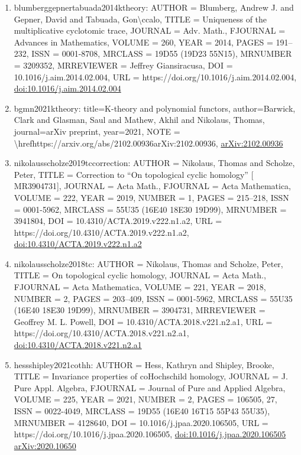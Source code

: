 \documentclass[11pt]{article}
\begin{document}
\begin{enumerate}[leftmargin=*]
  \item blumberggepnertabuada2014ktheory: AUTHOR = Blumberg, Andrew J. and Gepner, David and Tabuada, Gon\textbackslash{}ccalo, TITLE = Uniqueness of the multiplicative cyclotomic trace, JOURNAL = Adv. Math., FJOURNAL = Advances in Mathematics, VOLUME = 260, YEAR = 2014, PAGES = 191--232, ISSN = 0001-8708, MRCLASS = 19D55 (19D23 55N15), MRNUMBER = 3209352, MRREVIEWER = Jeffrey Giansiracusa, DOI = 10.1016/j.aim.2014.02.004, URL = https://doi.org/10.1016/j.aim.2014.02.004, \href{https://doi.org/10.1016/j.aim.2014.02.004}{doi:10.1016/j.aim.2014.02.004}
  \item bgmn2021ktheory: title=K-theory and polynomial functors, author=Barwick, Clark and Glasman, Saul and Mathew, Akhil and Nikolaus, Thomas, journal=arXiv preprint, year=2021, NOTE = \textbackslash{}hrefhttps://arxiv.org/abs/2102.00936arXiv:2102.00936, \href{https://arxiv.org/abs/2102.00936}{arXiv:2102.00936}
  \item nikolausscholze2019tccorrection: AUTHOR = Nikolaus, Thomas and Scholze, Peter, TITLE = Correction to ``On topological cyclic homology'' [ MR3904731], JOURNAL = Acta Math., FJOURNAL = Acta Mathematica, VOLUME = 222, YEAR = 2019, NUMBER = 1, PAGES = 215--218, ISSN = 0001-5962, MRCLASS = 55U35 (16E40 18E30 19D99), MRNUMBER = 3941804, DOI = 10.4310/ACTA.2019.v222.n1.a2, URL = https://doi.org/10.4310/ACTA.2019.v222.n1.a2, \href{https://doi.org/10.4310/ACTA.2019.v222.n1.a2}{doi:10.4310/ACTA.2019.v222.n1.a2}
  \item nikolausscholze2018tc: AUTHOR = Nikolaus, Thomas and Scholze, Peter, TITLE = On topological cyclic homology, JOURNAL = Acta Math., FJOURNAL = Acta Mathematica, VOLUME = 221, YEAR = 2018, NUMBER = 2, PAGES = 203--409, ISSN = 0001-5962, MRCLASS = 55U35 (16E40 18E30 19D99), MRNUMBER = 3904731, MRREVIEWER = Geoffrey M. L. Powell, DOI = 10.4310/ACTA.2018.v221.n2.a1, URL = https://doi.org/10.4310/ACTA.2018.v221.n2.a1, \href{https://doi.org/10.4310/ACTA.2018.v221.n2.a1}{doi:10.4310/ACTA.2018.v221.n2.a1}
  \item hessshipley2021cothh: AUTHOR = Hess, Kathryn and Shipley, Brooke, TITLE = Invariance properties of coHochschild homology, JOURNAL = J. Pure Appl. Algebra, FJOURNAL = Journal of Pure and Applied Algebra, VOLUME = 225, YEAR = 2021, NUMBER = 2, PAGES = 106505, 27, ISSN = 0022-4049, MRCLASS = 19D55 (16E40 16T15 55P43 55U35), MRNUMBER = 4128640, DOI = 10.1016/j.jpaa.2020.106505, URL = https://doi.org/10.1016/j.jpaa.2020.106505, \href{https://doi.org/10.1016/j.jpaa.2020.106505}{doi:10.1016/j.jpaa.2020.106505} \href{https://arxiv.org/abs/2020.10650}{arXiv:2020.10650}

\end{enumerate}
\end{document}
